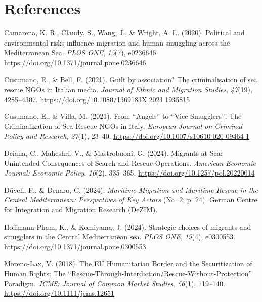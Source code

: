 \documentclass[
  11pt,
  a4paper,
]{article}
\newlength{\cslhangindent}
\newenvironment{CSLReferences}[2] %
 {\begin{list}{}{%
  \setlength{\itemindent}{0pt}
  \setlength{\leftmargin}{0pt}
  \setlength{\parsep}{0pt}
  \ifodd #1
   \setlength{\leftmargin}{\cslhangindent}
   \setlength{\itemindent}{-1\cslhangindent}
  \fi
  \setlength{\itemsep}{#2\baselineskip}}}
 {\end{list}}
\begin{document}
\section*{References}\label{references}

\protect{}\label{refs}
\begin{CSLReferences}{1}{0}
Camarena, K. R., Claudy, S., Wang, J., \& Wright, A. L. (2020).
Political and environmental risks influence migration and human
smuggling across the {Mediterranean Sea}. \emph{PLOS ONE}, \emph{15}(7),
e0236646. \url{https://doi.org/10.1371/journal.pone.0236646}

Cusumano, E., \& Bell, F. (2021). Guilt by association? {The}
criminalisation of sea rescue {NGOs} in {Italian} media. \emph{Journal
of Ethnic and Migration Studies}, \emph{47}(19), 4285--4307.
\url{https://doi.org/10.1080/1369183X.2021.1935815}

Cusumano, E., \& Villa, M. (2021). From {``{Angels}''} to {``{Vice
Smugglers}''}: The {Criminalization} of {Sea Rescue NGOs} in {Italy}.
\emph{European Journal on Criminal Policy and Research}, \emph{27}(1),
23--40. \url{https://doi.org/10.1007/s10610-020-09464-1}

Deiana, C., Maheshri, V., \& Mastrobuoni, G. (2024). Migrants at {Sea}:
{Unintended Consequences} of {Search} and {Rescue Operations}.
\emph{American Economic Journal: Economic Policy}, \emph{16}(2),
335--365. \url{https://doi.org/10.1257/pol.20220014}

Düvell, F., \& Denaro, C. (2024). \emph{Maritime {Migration} and
{Maritime Rescue} in the {Central Mediterranean}: {Perspectives} of {Key
Actors}} (No. 2; p. 24). {German Centre for Integration and Migration
Research (DeZIM).}

Hoffmann Pham, K., \& Komiyama, J. (2024). Strategic choices of migrants
and smugglers in the {Central Mediterranean} sea. \emph{PLOS ONE},
\emph{19}(4), e0300553.
\url{https://doi.org/10.1371/journal.pone.0300553}

Moreno-Lax, V. (2018). The {EU Humanitarian Border} and the
{Securitization} of {Human Rights}: {The}
{``{Rescue}-{Through}-{Interdiction}/{Rescue}-{Without}-{Protection}''}
{Paradigm}. \emph{JCMS: Journal of Common Market Studies}, \emph{56}(1),
119--140. \url{https://doi.org/10.1111/jcms.12651}


\end{CSLReferences}
\end{document}

